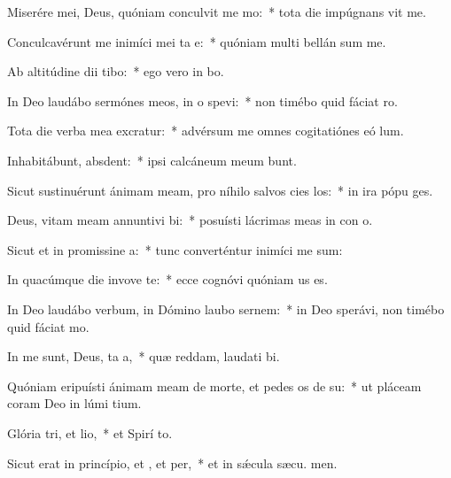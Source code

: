 \item Miserére mei, Deus, quóniam conculvit me mo:~* tota die impúgnans vit me.
\item Conculcavérunt me inimíci mei ta e:~* quóniam multi bellán sum me.
\item Ab altitúdine dii tibo:~* ego vero in  bo.
\item In Deo laudábo sermónes meos, in o spevi:~* non timébo quid fáciat  ro.
\item Tota die verba mea excratur:~* advérsum me omnes cogitatiónes eó  lum.
\item Inhabitábunt,  absdent:~* ipsi calcáneum meum bunt.
\item Sicut sustinuérunt ánimam meam, pro níhilo salvos cies los:~* in ira pópu ges.
\item Deus, vitam meam annuntivi bi:~* posuísti lácrimas meas in con o.
\item Sicut et in promissine a:~* tunc converténtur inimíci me sum:
\item In quacúmque die invove te:~* ecce cognóvi quóniam  us es.
\item In Deo laudábo verbum, in Dómino laubo sernem:~* in Deo sperávi, non timébo quid fáciat  mo.
\item In me sunt, Deus, ta a,~* quæ reddam, laudati bi.
\item Quóniam eripuísti ánimam meam de morte, et pedes os de su:~* ut pláceam coram Deo in lúmi tium.
\item Glória tri, et lio,~* et Spirí to.
\item Sicut erat in princípio, et , et per,~* et in sǽcula sæcu. men.
